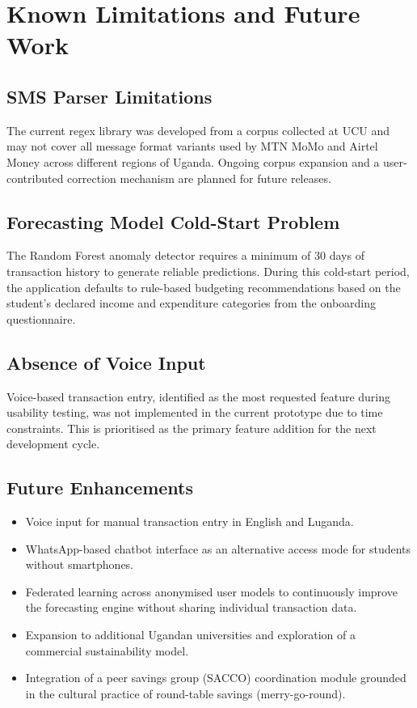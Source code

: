 \documentclass[12pt]{report}
\begin{document}
\section{Known Limitations and Future Work}

\subsection{SMS Parser Limitations}

The current regex library was developed from a corpus collected at UCU and may not
cover all message format variants used by MTN MoMo and Airtel Money across different
regions of Uganda. Ongoing corpus expansion and a user-contributed correction
mechanism are planned for future releases.

\subsection{Forecasting Model Cold-Start Problem}

The Random Forest anomaly detector requires a minimum of 30 days of transaction history to
generate reliable predictions. During this cold-start period, the application defaults to
rule-based budgeting recommendations based on the student's declared income and
expenditure categories from the onboarding questionnaire.

\subsection{Absence of Voice Input}

Voice-based transaction entry, identified as the most requested feature during usability
testing, was not implemented in the current prototype due to time constraints. This is
prioritised as the primary feature addition for the next development cycle.

\subsection{Future Enhancements}

\begin{itemize}
    \item Voice input for manual transaction entry in English and Luganda.
    \item WhatsApp-based chatbot interface as an alternative access mode for students without smartphones.
    \item Federated learning across anonymised user models to continuously improve the forecasting engine without sharing individual transaction data.
    \item Expansion to additional Ugandan universities and exploration of a commercial sustainability model.
    \item Integration of a peer savings group (SACCO) coordination module grounded in the cultural practice of round-table savings (merry-go-round).
\end{itemize}
\end{document}

